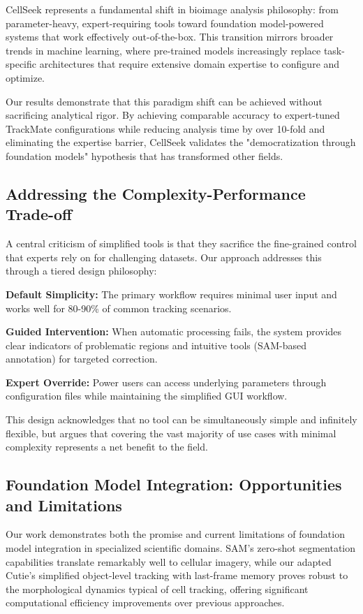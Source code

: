 \documentclass[12pt]{article}
\begin{document}
CellSeek represents a fundamental shift in bioimage analysis philosophy: from parameter-heavy, expert-requiring tools toward foundation model-powered systems that work effectively out-of-the-box. This transition mirrors broader trends in machine learning, where pre-trained models increasingly replace task-specific architectures that require extensive domain expertise to configure and optimize.

Our results demonstrate that this paradigm shift can be achieved without sacrificing analytical rigor. By achieving comparable accuracy to expert-tuned TrackMate configurations while reducing analysis time by over 10-fold and eliminating the expertise barrier, CellSeek validates the "democratization through foundation models" hypothesis that has transformed other fields.

\subsection{Addressing the Complexity-Performance Trade-off}

A central criticism of simplified tools is that they sacrifice the fine-grained control that experts rely on for challenging datasets. Our approach addresses this through a tiered design philosophy:

\textbf{Default Simplicity:} The primary workflow requires minimal user input and works well for 80-90\% of common tracking scenarios.

\textbf{Guided Intervention:} When automatic processing fails, the system provides clear indicators of problematic regions and intuitive tools (SAM-based annotation) for targeted correction.

\textbf{Expert Override:} Power users can access underlying parameters through configuration files while maintaining the simplified GUI workflow.

This design acknowledges that no tool can be simultaneously simple and infinitely flexible, but argues that covering the vast majority of use cases with minimal complexity represents a net benefit to the field.

\subsection{Foundation Model Integration: Opportunities and Limitations}

Our work demonstrates both the promise and current limitations of foundation model integration in specialized scientific domains. SAM's zero-shot segmentation capabilities translate remarkably well to cellular imagery, while our adapted Cutie's simplified object-level tracking with last-frame memory proves robust to the morphological dynamics typical of cell tracking, offering significant computational efficiency improvements over previous approaches.
\end{document}

